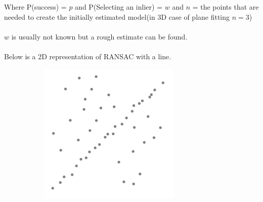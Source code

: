 				Where P(success) = $p$ and P(Selecting an inlier) = $w$ and $n$ = the points that are needed to create the initially estimated model(in 3D case of plane fitting $n = 3$)\\
				\\
				$w$ is usually not known but a rough estimate can be found.\\
				\\
				Below is a 2D representation of RANSAC with a line.
			
				\begin{figure}[H]
					\centering
					\begin{subfigure}{.5\textwidth}
						\centering
						\includegraphics[width=1\linewidth]{Includes/images/random_sample_example1}
						\label{fig:RANSAC1}
					\end{subfigure}%
					\begin{subfigure}{.5\textwidth}
						\centering

\end{subfigure}
\end{figure}
